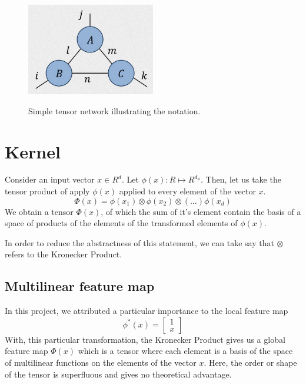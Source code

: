 \documentclass[11pt]{article}
\begin{document}
\begin{figure}[h]
\centering
\caption{Simple tensor network illustrating the notation.}
\includegraphics[width=0.5\textwidth]{images/2023-03-21-10-22-39.png}
\label{fig:tensor_net}
\end{figure}

\section{Kernel}

Consider an input vector $x \in R^d$. Let $\phi(x) : R \mapsto R^{d_{\phi}}$.  
Then, let us take the tensor product of apply $\phi(x)$ applied 
to every element of the vector $x$.
\begin{equation}
    \Phi(x) = \phi(x_1) \otimes  \phi(x_2) 
                \otimes (\dots) \phi(x_d)
\end{equation}
We obtain a tensor $\Phi(x)$, of which the sum of it's element 
contain the basis of a space of products of the elements of the transformed
elements of $\phi(x)$.

In order to reduce the abstractness of this statement, we can take say
that $\otimes$ refers to the Kronecker Product.

\subsection{Multilinear feature map}
In this project, we attributed a particular importance to the local feature map
\begin{equation}
    \phi^*(x) = 
    \begin{bmatrix}
        1 \\
        x
    \end{bmatrix}
\end{equation}
With, this particular transformation, the Kronecker Product gives us a global feature map
$\Phi(x)$ which is a tensor where each element is a basis of the 
space of multilinear functions on the elements of the vector $x$. Here, the 
order or shape of the tensor is superfluous and gives no theoretical advantage.
\end{document}
